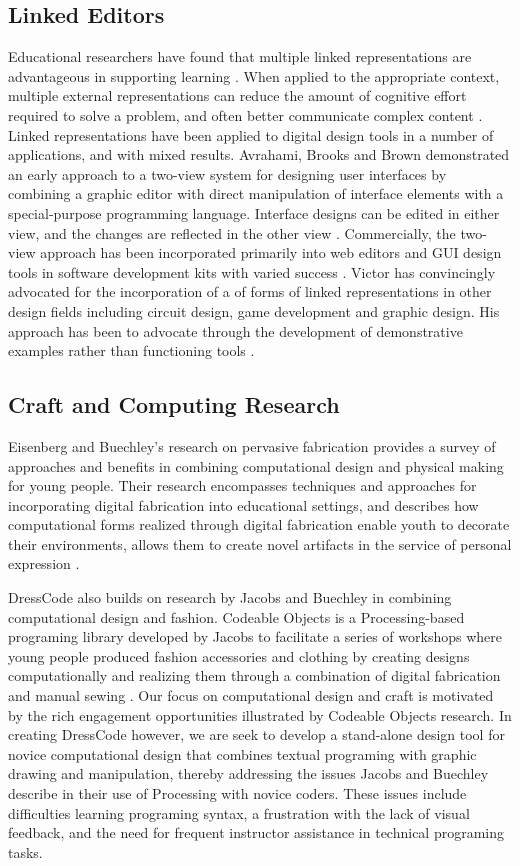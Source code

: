 \documentclass{sigchi}
\begin{document}
\subsection{Linked Editors}
Educational researchers have found that multiple linked representations are advantageous in supporting learning \cite{white}. When applied to the appropriate context, multiple external representations can reduce the amount of cognitive effort required to solve a problem, and often better communicate complex content \cite{ainsworth}. Linked representations have been applied to digital design tools in a number of applications, and with mixed results. Avrahami, Brooks and Brown demonstrated an early approach to a two-view system for designing user interfaces by combining a graphic editor with direct manipulation of interface elements with a special-purpose programming language. Interface designs can be edited in either view, and the changes are reflected in the other view \cite{two_view_ui}. Commercially, the two-view approach has been incorporated primarily into web editors and GUI design tools in software development kits with varied success \cite{view_based}. Victor has convincingly advocated for the incorporation of a of forms of linked representations in other design fields including circuit design, game development and graphic design. His approach has been to advocate through the development of demonstrative examples rather than functioning tools \cite{victor}. 

\subsection{Craft and Computing Research}
Eisenberg and Buechley's research on pervasive fabrication provides a survey of approaches and benefits in combining computational design and physical making for young people. Their research encompasses techniques and approaches for incorporating digital fabrication into educational settings, and describes how computational forms realized through digital fabrication enable youth to decorate their environments, allows them to create novel artifacts in the service of personal expression \cite{pervasive_fab}. 

DressCode also builds on research by Jacobs and Buechley in combining computational design and fashion. Codeable Objects is a Processing-based programing library developed by Jacobs to facilitate a series of workshops where young people produced fashion accessories and clothing by creating designs computationally and realizing them through a combination of digital fabrication and manual sewing \cite{codeable_objects}. Our focus on computational design and craft is motivated by the rich engagement opportunities illustrated by Codeable Objects research. In creating DressCode however, we are seek to develop a stand-alone design tool for novice computational design that combines textual programing with graphic drawing and manipulation, thereby addressing the issues Jacobs and Buechley describe in their use of Processing with novice coders. These issues include difficulties learning programing syntax, a frustration with the lack of visual feedback, and the need for frequent instructor assistance in technical programing tasks. 
\end{document}
